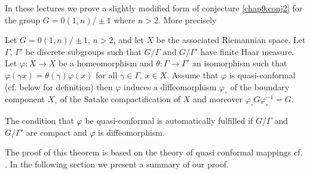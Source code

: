 In these lectures we prove a slightly modified form of conjecture
\ref{chap9:conj2} for the group $G = 0(1, n)/\pm 1$ where $n >
2$. More precisely 

\begin{thm} \label{chap9:thm9.3}
  Let $G= 0(1, n)/\pm 1$, $n> 2$, and let $X$ be the associated
  Riemannian space. Let $\Gamma$, $\Gamma'$ be discrete subgroups such
  that $G/\Gamma$ and $G/\Gamma'$ have finite Haar measure. Let
  $\varphi: X \to X$ be a homeomorphism and $\theta: \Gamma \to
  \Gamma'$ an isomorphism such that $\varphi (\gamma x)= \theta
  (\gamma) \varphi (x)$ for all $\gamma \in \Gamma$, $x \in X$. Assume
  that $\varphi$ is quasi-conformal (cf. below for definition) then
  $\varphi$ induces a diffeomorphism $\varphi_\circ$ of the boundary
  component $X_\circ$ of the Satake compactification of $X$ and
  moreover $\varphi_\circ G \varphi_\circ^{-1}=G$. 
\end{thm}

\begin{note}
  The condition that $\varphi$ be quasi-conformal is automatically
  fulfilled if $G/\Gamma$ and $G/\Gamma'$ are compact and $\varphi$ is
  diffeomorphism. 
\end{note}

The proof of this theorem is based on the theory of quasi conformal
mappings cf. \cite{17}. In the following section we present a summary
of our proof.
